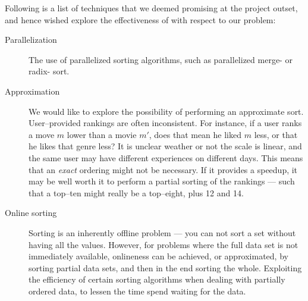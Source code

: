 \documentclass[a4paper, titlepage]{report}
\renewcommand{\%}{\scalebox{.9}{\oldpct}}
\begin{document}
Following is a list of techniques that we deemed promising at the project
outset, and hence wished explore the effectiveness of with respect to our
problem:

\begin{description}
	\item[Parallelization] The use of parallelized sorting algorithms, such
		as parallelized merge- or radix- sort.

	\item[Approximation] We would like to explore the possibility of
		performing an approximate sort. User--provided rankings are
		often inconsistent. For instance, if a user ranks a move $m$
		lower than a movie $m'$, does that mean he liked $m$ less, or
		that he likes that genre less? It is unclear weather or not the
		scale is linear, and the same user may have different
		experiences on different days. This means that an \textit{exact}
		ordering might not be necessary. If it provides a speedup, it
		may be well worth it to perform a partial sorting of the
		rankings --- such that a top--ten might really be a top--eight,
		plus 12 and 14.

	\item[Online sorting] Sorting is an inherently offline problem --- you
		can not sort a set without having all the values. However, for
		problems where the full data set is not immediately available,
		onlineness can be achieved, or approximated, by sorting partial
		data sets, and then in the end sorting the whole. Exploiting the
		efficiency of certain sorting algorithms when dealing with
		partially ordered data, to lessen the time spend waiting for the
		data.

\end{description}




\end{document}
